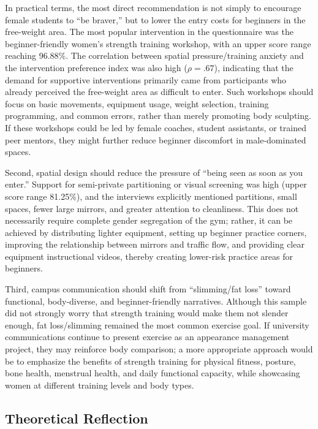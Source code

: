 In practical terms, the most direct recommendation is not simply to encourage female students to ``be braver,'' but to lower the entry costs for beginners in the free-weight area.
The most popular intervention in the questionnaire was the beginner-friendly women's strength training workshop, with an upper score range reaching 96.88\%.
The correlation between spatial pressure/training anxiety and the intervention preference index was also high ($\rho = .67$), indicating that the demand for supportive interventions primarily came from participants who already perceived the free-weight area as difficult to enter.
Such workshops should focus on basic movements, equipment usage, weight selection, training programming, and common errors, rather than merely promoting body sculpting.
If these workshops could be led by female coaches, student assistants, or trained peer mentors, they might further reduce beginner discomfort in male-dominated spaces.

Second, spatial design should reduce the pressure of ``being seen as soon as you enter.''
Support for semi-private partitioning or visual screening was high (upper score range 81.25\%), and the interviews explicitly mentioned partitions, small spaces, fewer large mirrors, and greater attention to cleanliness.
This does not necessarily require complete gender segregation of the gym; rather, it can be achieved by distributing lighter equipment, setting up beginner practice corners, improving the relationship between mirrors and traffic flow, and providing clear equipment instructional videos, thereby creating lower-risk practice areas for beginners.

Third, campus communication should shift from ``slimming/fat loss'' toward functional, body-diverse, and beginner-friendly narratives.
Although this sample did not strongly worry that strength training would make them not slender enough, fat loss/slimming remained the most common exercise goal.
If university communications continue to present exercise as an appearance management project, they may reinforce body comparison; a more appropriate approach would be to emphasize the benefits of strength training for physical fitness, posture, bone health, menstrual health, and daily functional capacity, while showcasing women at different training levels and body types.

\subsection{Theoretical Reflection}


